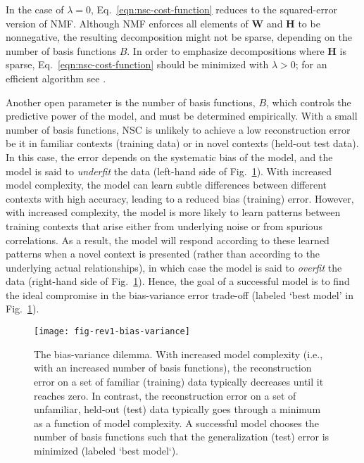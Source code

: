 In the case of $\lambda = 0$, Eq.~\ref{eqn:nsc-cost-function}
reduces to the squared-error version of \acf{NMF}.
Although \ac{NMF} enforces all elements of \textbf{W} and \textbf{H}
to be nonnegative,
the resulting decomposition might not be sparse,
depending on the number of basis functions $B$.
In order to emphasize decompositions where \textbf{H} is sparse,
Eq.~\ref{eqn:nsc-cost-function} should be minimized 
with $\lambda > 0$;
for an efficient algorithm see \cite{Hoyer2002}.

Another open parameter is the number of basis functions, $B$, 
which controls the predictive power of the model,
and must be determined empirically.
With a small number of basis functions,
\ac{NSC} is unlikely to achieve a low reconstruction error
be it in familiar contexts (training data) or in novel contexts
(held-out test data).
In this case, the error depends on the systematic bias of the model,
and the model is said to \emph{underfit} the data
(left-hand side of Fig.~\ref{fig:nsc-bias-variance-dilemma}).
With increased model complexity,
the model can learn subtle differences 
between different contexts with high accuracy,
leading to a reduced bias (training) error.
However, with increased complexity, the model is more likely to learn
patterns between training contexts that arise either from underlying noise
or from spurious correlations. As a result,
the model will respond according to
these learned patterns when a novel context is presented
(rather than according to the underlying actual relationships), 
in which case the model is said to \emph{overfit} the data
(right-hand side of Fig.~\ref{fig:nsc-bias-variance-dilemma}).
Hence, the goal of a successful model is to find the ideal compromise
in the bias-variance error trade-off \cite{Beyeler2017}
(labeled `best model' in Fig.~\ref{fig:nsc-bias-variance-dilemma}).

\begin{figure}[h]
	\centering
	\texttt{[image: fig-rev1-bias-variance]}
    \caption{The bias-variance dilemma.
    With increased model complexity 
    (i.e., with an increased number of basis functions), 
    the reconstruction error on a set
    of familiar (training) data typically decreases until it reaches zero.
    In contrast, the reconstruction error on a set of unfamiliar, held-out
    (test) data typically goes through a minimum as a function of model complexity.
    A successful model chooses the number of basis functions such that the
    generalization (test) error is minimized (labeled `best model`).}
	\label{fig:nsc-bias-variance-dilemma}
\end{figure}

